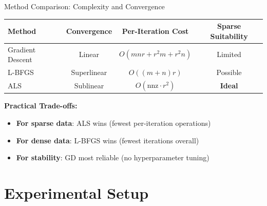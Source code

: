 \documentclass[aspectratio=169,usenames,dvipsnames]{beamer}
\begin{document}
\begin{frame}{Method Comparison: Complexity and Convergence}
    
    \begin{table}[h]
    \centering
    \renewcommand{\arraystretch}{1.2}
    \small
    \begin{tabular}{|l|c|c|c|}
    \hline
    \textbf{Method} & \textbf{Convergence} & \textbf{Per-Iteration Cost} & \textbf{Sparse Suitability} \\
    \hline
    Gradient Descent & Linear & $O(mnr + r^2 m + r^2 n)$ & Limited \\
    \hline
    L-BFGS & Superlinear & $O((m+n)r)$ & Possible \\
    \hline
    ALS & Sublinear & $O(\text{nnz} \cdot r^2)$ & \textcolor{emoryblue}{\textbf{Ideal}} \\
    \hline
    \end{tabular}
    \end{table}
    
    \vspace{0.4cm}
    
    \textbf{Practical Trade-offs:}
    \begin{itemize}
        \item \textcolor{emoryblue}{\textbf{For sparse data}}: ALS wins (fewest per-iteration operations)
        \item \textcolor{emoryblue}{\textbf{For dense data}}: L-BFGS wins (fewest iterations overall)
        \item \textcolor{emoryblue}{\textbf{For stability}}: GD most reliable (no hyperparameter tuning)
    \end{itemize}
\end{frame}

\section{Experimental Setup}
\end{document}
